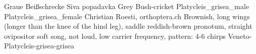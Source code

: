 {Graue Beißschrecke} %
{Siva popadavka} %
{Grey Bush-cricket} %
{Platycleis_grisea_male} %
{} %
{Platycleis_grisea_female}  %
{Christian Roesti, orthoptera.ch} %
{Brownish, long wings (longer than the knee of the hind leg), saddle reddish-brown pronotum, straight ovipositor} %
{soft song, not loud, low carrier frequency, pattern: 4-6 chirps} %
{Veneto-Platycleis-grisea-grisea} %
{} %
